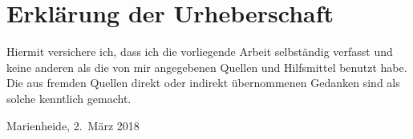 \documentclass{../thesis}
\begin{document}
\chapter*{Erklärung der Urheberschaft}
\thispagestyle{empty}

Hiermit versichere ich, dass ich die vorliegende Arbeit selbständig
verfasst und keine anderen als die von mir angegebenen Quellen und
Hilfsmittel benutzt habe. Die aus fremden Quellen direkt oder indirekt
übernommenen Gedanken sind als solche kenntlich gemacht.

\vspace{4em}

\noindent Marienheide, 2.~März 2018
\end{document}
